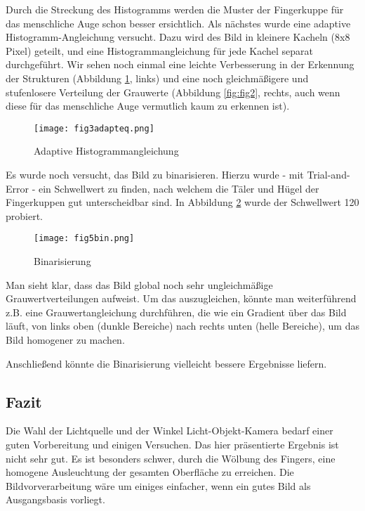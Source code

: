\documentclass{article}
\begin{document}
Durch die Streckung des Histogramms werden die Muster der Fingerkuppe für das menschliche Auge schon besser ersichtlich. Als nächstes wurde eine adaptive Histogramm-Angleichung versucht. Dazu wird des Bild in kleinere Kacheln (8x8 Pixel) geteilt, und eine Histogrammangleichung für jede Kachel separat durchgeführt. Wir sehen noch einmal eine leichte Verbesserung in der Erkennung der Strukturen (Abbildung \ref{fig:fig3}, links) und eine noch gleichmäßigere und stufenlosere Verteilung der Grauwerte (Abbildung \ref{fig:fig2}, rechts, auch wenn diese für das menschliche Auge vermutlich kaum zu erkennen ist).


\begin{figure}
    \centering
    \texttt{[image: fig3adapteq.png]}
    \caption{Adaptive Histogrammangleichung}
    \label{fig:fig3}
\end{figure}

Es wurde noch versucht, das Bild zu binarisieren. Hierzu wurde - mit Trial-and-Error - ein  Schwellwert zu finden, nach welchem die Täler und Hügel der Fingerkuppen gut unterscheidbar sind. In Abbildung \ref{fig:fig5} wurde der Schwellwert 120 probiert.

\begin{figure}
    \centering
    \texttt{[image: fig5bin.png]}
    \caption{Binarisierung}
    \label{fig:fig5}
\end{figure}

Man sieht klar, dass das Bild global noch sehr ungleichmäßige Grauwertverteilungen aufweist. Um das auszugleichen, könnte man weiterführend z.B. eine Grauwertangleichung durchführen, die wie ein Gradient über das Bild läuft, von links oben (dunkle Bereiche) nach rechts unten (helle Bereiche), um das Bild homogener zu machen.

Anschließend könnte die Binarisierung vielleicht bessere Ergebnisse liefern.

\subsection*{Fazit}

Die Wahl der Lichtquelle und der Winkel Licht-Objekt-Kamera bedarf einer guten Vorbereitung und einigen Versuchen. Das hier präsentierte Ergebnis ist nicht sehr gut. Es ist besonders schwer, durch die Wölbung des Fingers, eine homogene Ausleuchtung der gesamten Oberfläche zu erreichen. Die Bildvorverarbeitung wäre um einiges einfacher, wenn ein gutes Bild als Ausgangsbasis vorliegt.
\end{document}
